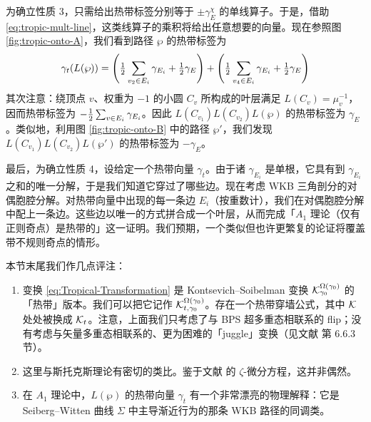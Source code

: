 

为确立性质 3，只需给出热带标签分别等于 $\pm\gamma^\chi_E$ 的单线算子。于是，借助 \eqref{eq:tropic-mult-line}，这类线算子的乘积将给出任意想要的向量。现在参照图 \ref{fig:tropic-onto-A}，我们看到路径 $\wp$ 的热带标签为
\begin{equation}
\gamma_t(L(\wp)) = \left(\tfrac{1}{2}\sum_{v_2\in E_i}\gamma_{E_i} + \tfrac{1}{2}\gamma_E\right) + \left(\tfrac{1}{2}\sum_{v_4\in E_i}\gamma_{E_i} + \tfrac{1}{2}\gamma_E\right)
\end{equation}
其次注意：绕顶点 $v$、权重为 $-1$ 的小圆 $C_v$ 所构成的叶层满足 $L(C_v)=\mu_v^{-1}$，因而热带标签为 $-\tfrac{1}{2}\sum_{v\in E_i}\gamma_{E_i}$。因此 $L(C_{v_1})L(C_{v_2})L(\wp)$ 的热带标签为 $\gamma_E$。类似地，利用图 \ref{fig:tropic-onto-B} 中的路径 $\wp'$，我们发现 $L(C_{v_1})L(C_{v_2})L(\wp')$ 的热带标签为 $-\gamma_E$。

最后，为确立性质 4，设给定一个热带向量 $\gamma_t$。由于诸 $\gamma_{E_i}$ 是单根，它具有到 $\gamma_{E_i}$ 之和的唯一分解，于是我们知道它穿过了哪些边。现在考虑 WKB 三角剖分的对偶胞腔分解。对热带向量中出现的每一条边 $E_i$（按重数计），我们在对偶胞腔分解中配上一条边。这些边以唯一的方式拼合成一个叶层，从而完成「$A_1$ 理论（仅有正则奇点）是热带的」这一证明。我们预期，一个类似但也许更繁复的论证将覆盖带不规则奇点的情形。

本节末尾我们作几点评注：

\begin{enumerate}
\item 变换 \eqref{eq:Tropical-Transformation} 是 Kontsevich--Soibelman 变换 $\mathcal{K}_{\gamma_0}^{\Omega(\gamma_0)}$ 的「热带」版本。我们可以把它记作 $\mathcal{K}_{t,\gamma_0}^{\Omega(\gamma_0)}$。存在一个热带穿墙公式，其中 $\mathcal{K}$ 处处被换成 $\mathcal{K}_t$。注意，上面我们只考虑了与 BPS 超多重态相联系的 flip；没有考虑与矢量多重态相联系的、更为困难的「juggle」变换（见文献 \cite{Gaiotto:2009hg} 第 6.6.3 节）。

\item 这里与斯托克斯理论有密切的类比。鉴于文献 \cite{Gaiotto:2008cd} 的 $\zeta$-微分方程，这并非偶然。

\item 在 $A_1$ 理论中，$L(\wp)$ 的热带向量 $\gamma_t$ 有一个非常漂亮的物理解释：它是 Seiberg--Witten 曲线 $\Sigma$ 中主导渐近行为的那条 WKB 路径的同调类。
\end{enumerate}

